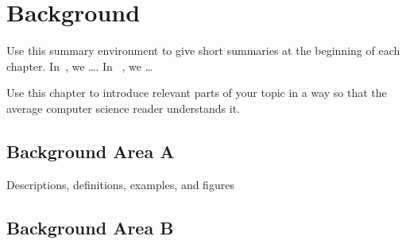 \setchaptertoc
\chapter{Background}\label{chp:background}

\begin{summary}
    Use this summary environment to give short summaries at the beginning of each chapter.
    In~, we \dots.
    In ~, we \dots
\end{summary}

Use this chapter to introduce relevant parts of your topic in a way so that the average computer science reader understands it.

\section{Background Area A}\label{sec:background:A}
Descriptions, definitions, examples, and figures

\section{Background Area B}\label{sec:background:B}

